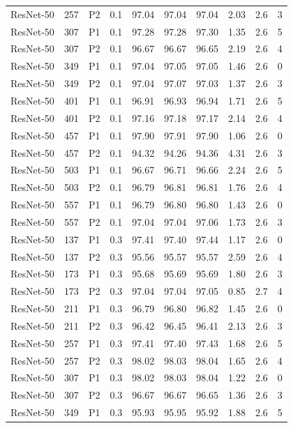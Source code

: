 {\begin{longtable}{lrllrrrrrr}
ResNet-50 & 257 & P2 & 0.1 & 97.04 & 97.04 & 97.04 & 2.03 & 2.6 & 3 \\
ResNet-50 & 307 & P1 & 0.1 & 97.28 & 97.28 & 97.30 & 1.35 & 2.6 & 5 \\
ResNet-50 & 307 & P2 & 0.1 & 96.67 & 96.67 & 96.65 & 2.19 & 2.6 & 4 \\
ResNet-50 & 349 & P1 & 0.1 & 97.04 & 97.05 & 97.05 & 1.46 & 2.6 & 0 \\
ResNet-50 & 349 & P2 & 0.1 & 97.04 & 97.07 & 97.03 & 1.37 & 2.6 & 3 \\
ResNet-50 & 401 & P1 & 0.1 & 96.91 & 96.93 & 96.94 & 1.71 & 2.6 & 5 \\
ResNet-50 & 401 & P2 & 0.1 & 97.16 & 97.18 & 97.17 & 2.14 & 2.6 & 4 \\
ResNet-50 & 457 & P1 & 0.1 & 97.90 & 97.91 & 97.90 & 1.06 & 2.6 & 0 \\
ResNet-50 & 457 & P2 & 0.1 & 94.32 & 94.26 & 94.36 & 4.31 & 2.6 & 3 \\
ResNet-50 & 503 & P1 & 0.1 & 96.67 & 96.71 & 96.66 & 2.24 & 2.6 & 5 \\
ResNet-50 & 503 & P2 & 0.1 & 96.79 & 96.81 & 96.81 & 1.76 & 2.6 & 4 \\
ResNet-50 & 557 & P1 & 0.1 & 96.79 & 96.80 & 96.80 & 1.43 & 2.6 & 0 \\
ResNet-50 & 557 & P2 & 0.1 & 97.04 & 97.04 & 97.06 & 1.73 & 2.6 & 3 \\
ResNet-50 & 137 & P1 & 0.3 & 97.41 & 97.40 & 97.44 & 1.17 & 2.6 & 0 \\
ResNet-50 & 137 & P2 & 0.3 & 95.56 & 95.57 & 95.57 & 2.59 & 2.6 & 4 \\
ResNet-50 & 173 & P1 & 0.3 & 95.68 & 95.69 & 95.69 & 1.80 & 2.6 & 3 \\
ResNet-50 & 173 & P2 & 0.3 & 97.04 & 97.04 & 97.05 & 0.85 & 2.7 & 4 \\
ResNet-50 & 211 & P1 & 0.3 & 96.79 & 96.80 & 96.82 & 1.45 & 2.6 & 0 \\
ResNet-50 & 211 & P2 & 0.3 & 96.42 & 96.45 & 96.41 & 2.13 & 2.6 & 3 \\
ResNet-50 & 257 & P1 & 0.3 & 97.41 & 97.40 & 97.43 & 1.68 & 2.6 & 5 \\
ResNet-50 & 257 & P2 & 0.3 & 98.02 & 98.03 & 98.04 & 1.65 & 2.6 & 4 \\
ResNet-50 & 307 & P1 & 0.3 & 98.02 & 98.03 & 98.04 & 1.22 & 2.6 & 0 \\
ResNet-50 & 307 & P2 & 0.3 & 96.67 & 96.67 & 96.65 & 1.36 & 2.6 & 3 \\
ResNet-50 & 349 & P1 & 0.3 & 95.93 & 95.95 & 95.92 & 1.88 & 2.6 & 5 \\

\end{longtable}}
